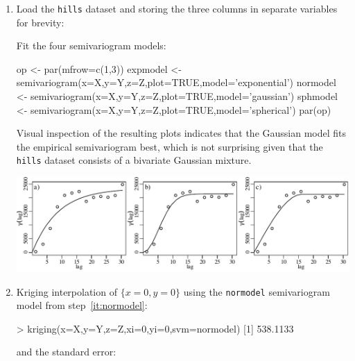 \begin{enumerate}
  
\item\label{it:normodel} Load the \texttt{hills} dataset and storing
  the three columns in separate variables for brevity:


Fit the four semivariogram models:

\begin{script}[firstnumber=4]
op <- par(mfrow=c(1,3))
expmodel <- semivariogram(x=X,y=Y,z=Z,plot=TRUE,model='exponential')
normodel <- semivariogram(x=X,y=Y,z=Z,plot=TRUE,model='gaussian')
sphmodel <- semivariogram(x=X,y=Y,z=Z,plot=TRUE,model='spherical')
par(op)
\end{script}

Visual inspection of the resulting plots indicates that the Gaussian
model fits the empirical semivariogram best, which is not surprising
given that the \texttt{hills} dataset consists of a bivariate Gaussian
mixture.

\noindent\begin{minipage}[t][][b]{\linewidth}
\includegraphics[width=\linewidth]{../figures/hills.pdf}
\end{minipage}
\begin{minipage}[t][][t]{\linewidth}
\end{minipage}

\item Kriging interpolation of $\{x=0,y=0\}$ using the
  \texttt{normodel} semivariogram model from step~\ref{it:normodel}:

\begin{console}
> kriging(x=X,y=Y,z=Z,xi=0,yi=0,svm=normodel)
[1] 538.1133
\end{console}

\noindent and the standard error:


\end{enumerate}
